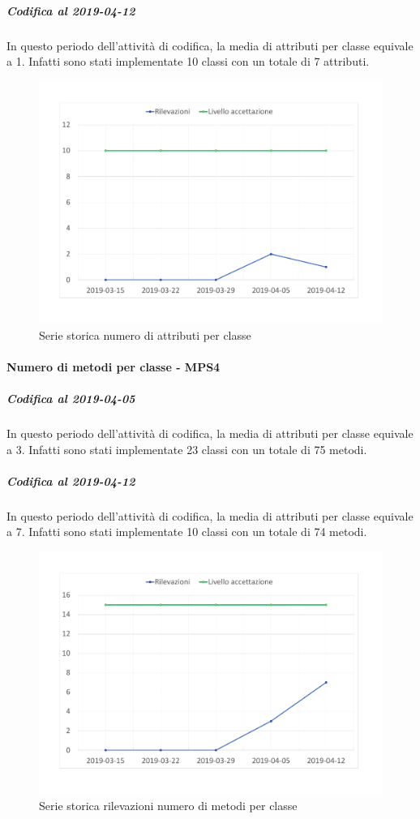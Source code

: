 \subparagraph{Codifica al 2019-04-12}
In questo periodo dell'attività di codifica, la media di attributi per classe equivale a 1. Infatti sono stati implementate 10 classi con un totale di 7 attributi.
\begin{figure}[H]
	\centering
	\includegraphics[scale=0.6]{images/resoconto/MPS3Chart.pdf}
	\caption{Serie storica numero di attributi per classe}	
\end{figure}

\paragraph{Numero di metodi per classe - MPS4}
\subparagraph{Codifica al 2019-04-05}
In questo periodo dell'attività di codifica, la media di attributi per classe equivale a 3. Infatti sono stati implementate 23 classi con un totale di 75 metodi.

\subparagraph{Codifica al 2019-04-12}
In questo periodo dell'attività di codifica, la media di attributi per classe equivale a 7. Infatti sono stati implementate 10 classi con un totale di 74 metodi.
\begin{figure}[H]
	\centering
	\includegraphics[scale=0.6]{images/resoconto/MPS4Chart.pdf}
	\caption{Serie storica rilevazioni numero di metodi per classe}	
\end{figure}

